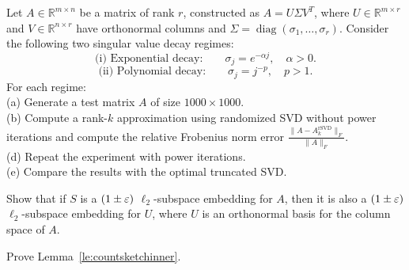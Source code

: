 \begin{myexercise}
Let $A \in \mathbb{R}^{m \times n}$ be a matrix of rank $r$, constructed as
$A = U \Sigma  V^T$, where $U \in \mathbb{R}^{m\times r}$ and $V \in \mathbb{R}^{n\times r}$ have orthonormal columns and $\Sigma =\operatorname{diag}(\sigma_1,\dots,\sigma_r)$. Consider the following two singular value decay regimes:
$$\text{(i) Exponential decay:} \qquad
   \sigma_j = e^{-\alpha j}, \quad \alpha > 0.
$$
$$\text{(ii) Polynomial decay:} \qquad
   \sigma_j = j^{-p}, \quad p > 1.$$
For each regime: \\
(a) Generate a test matrix $A$ of size $1000\times 1000$. \\
(b) Compute a rank-$k$ approximation using randomized SVD without power iterations and
compute the relative Frobenius norm error
$\frac{\|A - A_k^{\mathrm{rSVD}}\|_F}{\|A\|_F}$.
\\
(d) Repeat the experiment with power iterations.\\
(e) Compare the results with the optimal truncated SVD.
\end{myexercise}

\begin{myexercise}
Show that if $S$ is a $(1\pm \varepsilon)$ $\ell_2$-subspace embedding for $A$, then it is also a $(1\pm \varepsilon)$ $\ell_2$-subspace embedding for $U$, where $U$ is an orthonormal basis for the column space of $A$.    
\end{myexercise}

\begin{myexercise}\label{ex:countsketch}
Prove Lemma~\ref{le:countsketchinner}.    
\end{myexercise}


